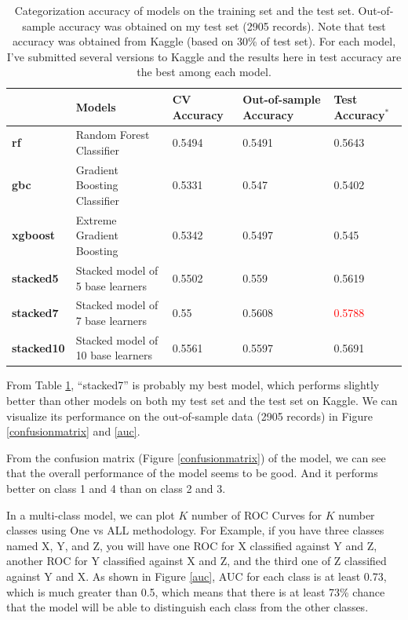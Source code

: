 \documentclass[11pt]{article}
\begin{document}
\begin{table}[h]
    \centering
    \begin{tabular}{lllll}
    \toprule
    & Models & CV Accuracy & Out-of-sample Accuracy & Test Accuracy$^*$\\
    \midrule
    \textbf{rf}  & Random Forest Classifier &  0.5494  &  0.5491  &  0.5643   \\  
    \textbf{gbc} & Gradient Boosting Classifier &  0.5331  &  0.547  &  0.5402   \\  
    \textbf{xgboost} & Extreme Gradient Boosting &  0.5342  &  0.5497  &  0.545   \\  
    \textbf{stacked5} & Stacked model of 5 base learners &  0.5502  &  0.559  &   0.5619  \\  
    \textbf{stacked7} & Stacked model of 7 base learners  &  0.55  &  0.5608  &   \textcolor{red}{0.5788}  \\  
    \textbf{stacked10} & Stacked model of 10 base learners  &  0.5561  &  0.5597  &   0.5691  \\  
    \bottomrule    
    \end{tabular}
    \caption{Categorization accuracy of models on the training set and the test set. Out-of-sample accuracy was obtained on my test set (2905 records). Note that test accuracy was obtained from Kaggle (based on 30\% of test set). For each model, I've submitted several versions to Kaggle and the results here in test accuracy are the best among each model.}
    \label{compare}
\end{table}

From Table \ref{compare}, ``stacked7'' is probably my best model, which performs slightly better than other models on both my test set and the test set on Kaggle. We can visualize its performance on the out-of-sample data (2905 records) in Figure \ref{confusionmatrix} and \ref{auc}. 

From the confusion matrix (Figure \ref{confusionmatrix}) of the model, we can see that the overall performance of the model seems to be good. And it performs better on class 1 and 4 than on class 2 and 3. 

In a multi-class model, we can plot $K$ number of ROC Curves for $K$ number classes using One vs ALL methodology. For Example, if you have three classes named X, Y, and Z, you will have one ROC for X classified against Y and Z, another ROC for Y classified against X and Z, and the third one of Z classified against Y and X. As shown in Figure \ref{auc}, AUC for each class is at least 0.73, which is much greater than 0.5, which means that there is at least 73\% chance that the model will be able to distinguish each class from the other classes.
\end{document}
